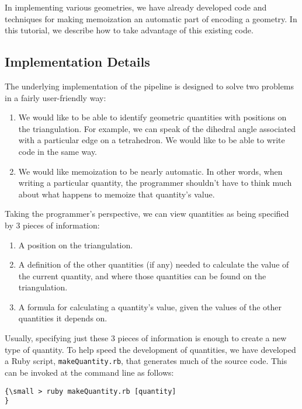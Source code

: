 In implementing various geometries, we have already developed code and
techniques for making memoization an automatic part of encoding a geometry.
In this tutorial, we describe how to take advantage of this existing code.

\subsection*{Implementation Details}

The underlying implementation of the pipeline is designed to solve two
problems in a fairly user-friendly way:

\begin{enumerate}
\item We would like to be able to identify geometric quantities with
positions on the triangulation. For example, we can speak of the dihedral
angle associated with a particular edge on a tetrahedron. We would like to
be able to write code in the same way.

\item We would like memoization to be nearly automatic. In other words, when
writing a particular quantity, the programmer shouldn't have to think much
about what happens to memoize that quantity's value.
\end{enumerate}

Taking the programmer's perspective, we can view quantities as being
specified by 3 pieces of information:

\begin{enumerate}
\item A position on the triangulation.

\item A definition of the other quantities (if any) needed to calculate the
value of the current quantity, and where those quantities can be found on
the triangulation.

\item A formula for calculating a quantity's value, given the values of the
other quantities it depends on.
\end{enumerate}

Usually, specifying just these 3 pieces of information is enough to create a
new type of quantity. To help speed the development of quantities, we have
developed a Ruby script, \texttt{makeQuantity.rb}, that generates much of
the source code. This can be invoked at the command line as follows: {\small 
}
\begin{verbatim}
{\small > ruby makeQuantity.rb [quantity]
}
\end{verbatim}

